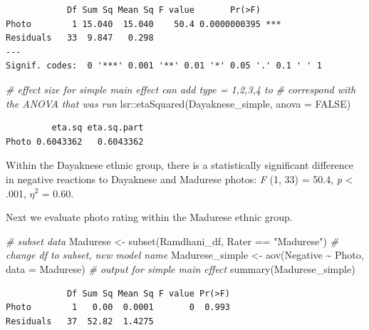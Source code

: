 \documentclass[
  11pt,
]{book}
\newenvironment{Shaded}{\begin{snugshade}}{\end{snugshade}}
\newcommand{\AttributeTok}[1]{\textcolor[rgb]{0.77,0.63,0.00}{#1}}
\newcommand{\CommentTok}[1]{\textcolor[rgb]{0.56,0.35,0.01}{\textit{#1}}}
\newcommand{\ConstantTok}[1]{\textcolor[rgb]{0.00,0.00,0.00}{#1}}
\newcommand{\FunctionTok}[1]{\textcolor[rgb]{0.00,0.00,0.00}{#1}}
\newcommand{\NormalTok}[1]{#1}
\newcommand{\OtherTok}[1]{\textcolor[rgb]{0.56,0.35,0.01}{#1}}
\newcommand{\SpecialCharTok}[1]{\textcolor[rgb]{0.00,0.00,0.00}{#1}}
\newcommand{\StringTok}[1]{\textcolor[rgb]{0.31,0.60,0.02}{#1}}
\begin{document}
\begin{verbatim}
            Df Sum Sq Mean Sq F value       Pr(>F)    
Photo        1 15.040  15.040    50.4 0.0000000395 ***
Residuals   33  9.847   0.298                         
---
Signif. codes:  0 '***' 0.001 '**' 0.01 '*' 0.05 '.' 0.1 ' ' 1
\end{verbatim}

\begin{Shaded}
\begin{Highlighting}[]
\CommentTok{\# effect size for simple main effect can add \textquotesingle{}type = 1,2,3,4\textquotesingle{} to}
\CommentTok{\# correspond with the ANOVA that was run}
\NormalTok{lsr}\SpecialCharTok{::}\FunctionTok{etaSquared}\NormalTok{(Dayaknese\_simple, }\AttributeTok{anova =} \ConstantTok{FALSE}\NormalTok{)}
\end{Highlighting}
\end{Shaded}

\begin{verbatim}
         eta.sq eta.sq.part
Photo 0.6043362   0.6043362
\end{verbatim}

Within the Dayaknese ethnic group, there is a statistically significant difference in negative reactions to Dayaknese and Madurese photos: \emph{F} (1, 33) = 50.4, \emph{p} \textless{} .001, \(\eta ^{2}\) = 0.60.

Next we evaluate photo rating within the Madurese ethnic group.

\begin{Shaded}
\begin{Highlighting}[]
\CommentTok{\# subset data}
\NormalTok{Madurese }\OtherTok{\textless{}{-}} \FunctionTok{subset}\NormalTok{(Ramdhani\_df, Rater }\SpecialCharTok{==} \StringTok{"Madurese"}\NormalTok{)}
\CommentTok{\# change df to subset, new model name}
\NormalTok{Madurese\_simple }\OtherTok{\textless{}{-}} \FunctionTok{aov}\NormalTok{(Negative }\SpecialCharTok{\textasciitilde{}}\NormalTok{ Photo, }\AttributeTok{data =}\NormalTok{ Madurese)}
\CommentTok{\# output for simple main effect}
\FunctionTok{summary}\NormalTok{(Madurese\_simple)}
\end{Highlighting}
\end{Shaded}

\begin{verbatim}
            Df Sum Sq Mean Sq F value Pr(>F)
Photo        1   0.00  0.0001       0  0.993
Residuals   37  52.82  1.4275               
\end{verbatim}
\end{document}
